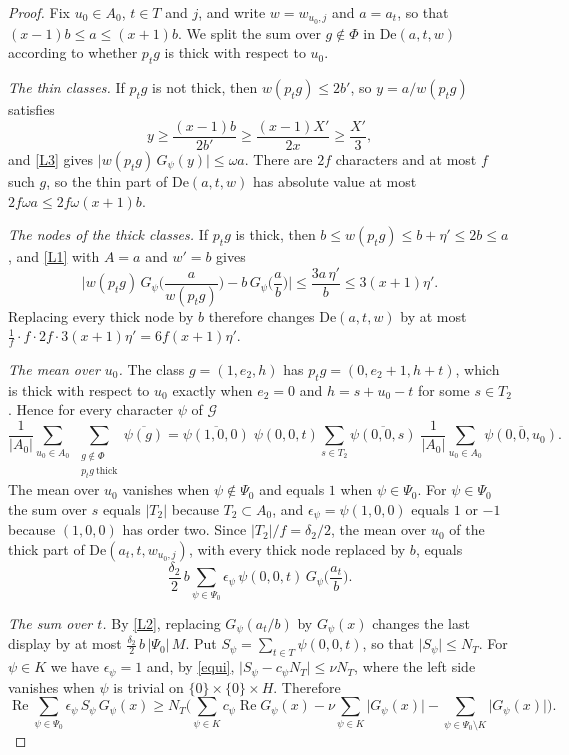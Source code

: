 \begin{proof}
Fix $u_0\in A_0$, $t\in T$ and $j$, and write $w=w_{u_0,j}$ and $a=a_t$, so that $(x-1)b\le a\le(x+1)b$. We split the sum over $g\notin\Phi$ in $\mathrm{De}(a,t,w)$ according to whether $p_tg$ is thick with respect to $u_0$.

\emph{The thin classes.} If $p_tg$ is not thick, then $w(p_tg)\le2b'$, so $y=a/w(p_tg)$ satisfies
\[
y\ge\frac{(x-1)b}{2b'}\ge\frac{(x-1)X'}{2x}\ge\frac{X'}3 ,
\]
and \eqref{L3} gives $\lvert w(p_tg)\,G_\psi(y)\rvert\le\omega a$. There are $2f$ characters and at most $f$ such $g$, so the thin part of $\mathrm{De}(a,t,w)$ has absolute value at most $2f\omega a\le2f\omega(x+1)b$.

\emph{The nodes of the thick classes.} If $p_tg$ is thick, then $b\le w(p_tg)\le b+\eta'\le2b\le a$, and \eqref{L1} with $A=a$ and $w'=b$ gives
\[
\Big\lvert w(p_tg)\,G_\psi\Big(\frac a{w(p_tg)}\Big)-b\,G_\psi\Big(\frac ab\Big)\Big\rvert\le\frac{3a\,\eta'}b\le3(x+1)\eta' .
\]
Replacing every thick node by $b$ therefore changes $\mathrm{De}(a,t,w)$ by at most $\frac1f\cdot f\cdot2f\cdot3(x+1)\eta'=6f(x+1)\eta'$.

\emph{The mean over $u_0$.} The class $g=(1,e_2,h)$ has $p_tg=(0,e_2+1,h+t)$, which is thick with respect to $u_0$ exactly when $e_2=0$ and $h=s+u_0-t$ for some $s\in T_2$. Hence for every character $\psi$ of $\mathcal G$
\[
\frac1{\lvert A_0\rvert}\sum_{u_0\in A_0}\ \sum_{\substack{g\notin\Phi\\ p_tg\ \mathrm{thick}}}\overline{\psi(g)}
=\overline{\psi(1,0,0)}\;\psi(0,0,t)\sum_{s\in T_2}\overline{\psi(0,0,s)}\;\frac1{\lvert A_0\rvert}\sum_{u_0\in A_0}\overline{\psi(0,0,u_0)} .
\]
The mean over $u_0$ vanishes when $\psi\notin\Psi_0$ and equals $1$ when $\psi\in\Psi_0$. For $\psi\in\Psi_0$ the sum over $s$ equals $\lvert T_2\rvert$ because $T_2\subset A_0$, and $\epsilon_\psi=\psi(1,0,0)$ equals $1$ or $-1$ because $(1,0,0)$ has order two. Since $\lvert T_2\rvert/f=\delta_2/2$, the mean over $u_0$ of the thick part of $\mathrm{De}(a_t,t,w_{u_0,j})$, with every thick node replaced by $b$, equals
\[
\frac{\delta_2}2\,b\sum_{\psi\in\Psi_0}\epsilon_\psi\,\psi(0,0,t)\,G_\psi\Big(\frac{a_t}b\Big).
\]

\emph{The sum over $t$.} By \eqref{L2}, replacing $G_\psi(a_t/b)$ by $G_\psi(x)$ changes the last display by at most $\frac{\delta_2}2\,b\,\lvert\Psi_0\rvert\,M$. Put $S_\psi=\sum_{t\in T}\psi(0,0,t)$, so that $\lvert S_\psi\rvert\le N_T$. For $\psi\in K$ we have $\epsilon_\psi=1$ and, by \eqref{equi}, $\lvert S_\psi-c_\psi N_T\rvert\le\nu N_T$, where the left side vanishes when $\psi$ is trivial on $\{0\}\times\{0\}\times H$. Therefore
\[
\operatorname{Re}\sum_{\psi\in\Psi_0}\epsilon_\psi\,S_\psi\,G_\psi(x)\ge N_T\Big(\sum_{\psi\in K}c_\psi\operatorname{Re}G_\psi(x)-\nu\sum_{\psi\in K}\lvert G_\psi(x)\rvert-\sum_{\psi\in\Psi_0\setminus K}\lvert G_\psi(x)\rvert\Big).
\]


\end{proof}
